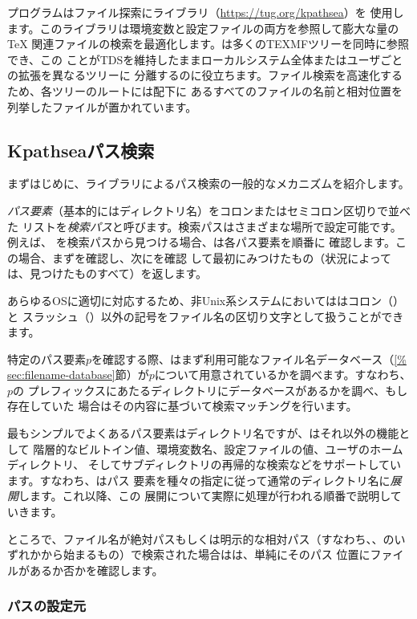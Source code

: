 \documentclass[uplatex,dvipdfmx,12pt,tombow]{jsarticle}
\begin{document}
\Webc プログラムはファイル探索に\KPS ライブラリ（\url{https://tug.org/kpathsea}）を
使用します。このライブラリは環境変数と設定ファイルの両方を参照して膨大な量の\TeX
関連ファイルの検索を最適化します。\Webc は多くのTEXMFツリーを同時に参照でき、この
ことがTDSを維持したままローカルシステム全体またはユーザごとの拡張を異なるツリーに
分離するのに役立ちます。ファイル検索を高速化するため、各ツリーのルートには配下に
あるすべてのファイルの名前と相対位置を列挙したファイルが置かれています。

\subsection{Kpathseaパス検索}
\label{sec:kpathsea}

まずはじめに、\KPS ライブラリによるパス検索の一般的なメカニズムを紹介します。

\emph{パス要素}（基本的にはディレクトリ名）をコロンまたはセミコロン区切りで並べた
リストを\emph{検索パス}と呼びます。検索パスはさまざまな場所で設定可能です。例えば、
を検索パスから見つける場合、\KPS は各パス要素を順番に
確認します。この場合、まずを確認し、次にを確認
して最初にみつけたもの（状況によっては、見つけたものすべて）を返します。

あらゆるOSに適切に対応するため、非Unix系システムにおいては\KPS はコロン（\samp{:}）と
スラッシュ（\samp{/}）以外の記号をファイル名の区切り文字として扱うことができます。

特定のパス要素$p$を確認する際、\KPS はまず利用可能なファイル名データベース（\ref{%
sec:filename-database}節）が$p$について用意されているかを調べます。すなわち、$p$の
プレフィックスにあたるディレクトリにデータベースがあるかを調べ、もし存在していた
場合はその内容に基づいて検索マッチングを行います。

最もシンプルでよくあるパス要素はディレクトリ名ですが、\KPS はそれ以外の機能として
階層的なビルトイン値、環境変数名、設定ファイルの値、ユーザのホームディレクトリ、
そしてサブディレクトリの再帰的な検索などをサポートしています。すなわち、\KPS はパス
要素を種々の指定に従って通常のディレクトリ名に\emph{展開}します。これ以降、この
展開について実際に処理が行われる順番で説明していきます。

ところで、ファイル名が絶対パスもしくは明示的な相対パス（すなわち\samp{/}、、のいずれかから始まるもの）で検索された場合は\KPS は、単純にそのパス
位置にファイルがあるか否かを確認します。

\subsubsection{パスの設定元}
\label{sec:path-sources}
\end{document}
